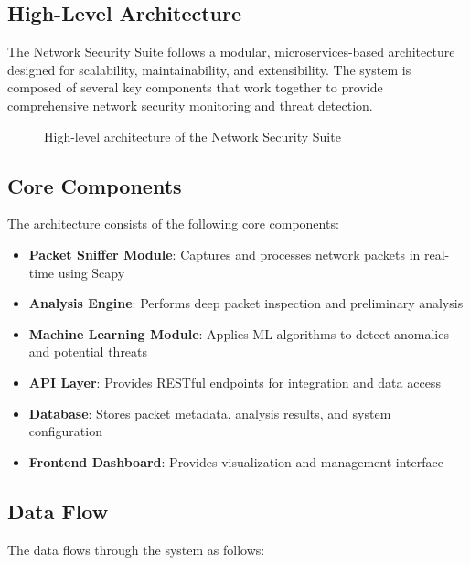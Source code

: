 \subsection{High-Level Architecture}
The Network Security Suite follows a modular, microservices-based architecture designed for scalability, maintainability, and extensibility. The system is composed of several key components that work together to provide comprehensive network security monitoring and threat detection.

\begin{figure}[H]
    \centering

    \caption{High-level architecture of the Network Security Suite}
    \label{fig:architecture}
\end{figure}

\subsection{Core Components}
The architecture consists of the following core components:

\begin{itemize}
    \item \textbf{Packet Sniffer Module}: Captures and processes network packets in real-time using Scapy
    \item \textbf{Analysis Engine}: Performs deep packet inspection and preliminary analysis
    \item \textbf{Machine Learning Module}: Applies ML algorithms to detect anomalies and potential threats
    \item \textbf{API Layer}: Provides RESTful endpoints for integration and data access
    \item \textbf{Database}: Stores packet metadata, analysis results, and system configuration
    \item \textbf{Frontend Dashboard}: Provides visualization and management interface
\end{itemize}

\subsection{Data Flow}
The data flows through the system as follows:

